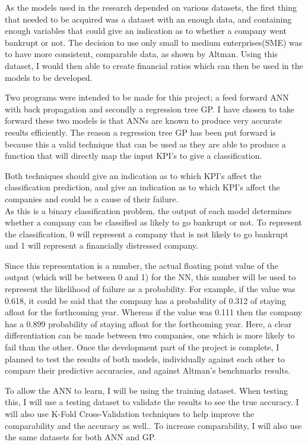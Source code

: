 \documentclass[11pt]{article}
\begin{document}
As the models used in the research depended on various datasets, the first thing that needed to be acquired was a dataset with an enough data, and containing enough variables that could give an indication as to whether a company went bankrupt or not. The decision to use only small to medium enterprises(SME) was to have more consistent, comparable data, as shown by Altman. Using this dataset, I would then able to create financial ratios which can then be used in the models to be developed. 

Two programs were intended to be made for this project; a feed forward ANN with back propagation and secondly a regression tree GP.  I have chosen to take forward these two models is that ANNs are known to produce very accurate results efficiently. The reason a regression tree GP has been put forward is because this a valid technique that can be used as they are able to produce a function that will directly map the input KPI's to give a classification.

Both techniques should give an indication as to which KPI's affect the classification prediction, and give an indication as to which KPI's affect the companies and could be a cause of their failure.  \\
As this is a binary classification problem, the output of each model determines whether a company can be classified as likely to go bankrupt or not. To represent the classification,  0 will represent a company that is not likely to go bankrupt  and 1 will represent a financially distressed company.

Since this representation is a number, the actual floating point value of the output (which will be between 0 and 1) for the NN, this number will be used to represent the likelihood of failure as a probability. For example, if the value was 0.618, it could be said that the company has a probability of 0.312 of staying afloat for the forthcoming year. Whereas if the value was 0.111 then the company has a 0.899 probability of staying afloat for the forthcoming year. Here, a clear differentiation can be made between two companies, one which is more likely to fail than the other.
Once the development part of the project is complete, I planned to test the results of both models, individually against each other to compare their predictive accuracies, and against Altman's benchmarks results.

To allow the ANN to learn, I will be using the training dataset. When testing this, I will use a testing dataset to validate the results to see the true accuracy. I will also use K-Fold Cross-Validation techniques to help improve the comparability and the accuracy as well.. To increase comparability, I will also use the same datasets for both ANN and GP.
\end{document}
